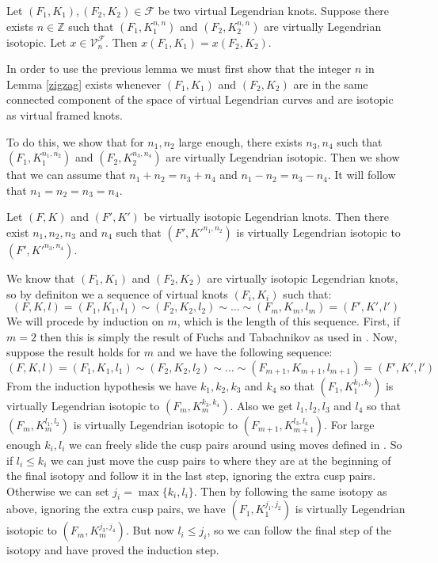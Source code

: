 \begin{lem}\label{zigzag} Let $(F_1,K_1), (F_2, K_2) \in \mathcal{F}$ be two virtual Legendrian knots. Suppose there exists $n\in \mathbb{Z}$ such that $(F_1,K_1^{n,n})$ and $(F_2,K_2^{n,n})$ are virtually Legendrian isotopic.  Let $x\in\mathcal{V}^\mathcal{F}_n$.  Then $x(F_1,K_1)=x(F_2,K_2)$.
\end{lem}

In order to use the previous lemma we must first show that the integer $n$ in Lemma \ref{zigzag} exists whenever $(F_1,K_1)$ and $(F_2,K_2)$ are in the same connected component of the space of virtual Legendrian curves and are isotopic as virtual framed knots.

To do this, we show that for $n_1,n_2$ large enough, there exists $n_3,n_4$ such that $(F_1,K_1^{n_1,n_2})$ and $(F_2,K_2^{n_3,n_4})$ are virtually Legendrian isotopic.  Then we show that we can assume that $n_1+n_2=n_3+n_4$ and $n_1-n_2=n_3-n_4$.  It will follow that $n_1=n_2=n_3=n_4$.


\begin{prop}\label{fuchstab}
Let $(F, K)$ and $(F', K')$ be virtually isotopic Legendrian knots.  Then there exist $n_1, n_2, n_3$ and $n_4$ such that $(F',K'^{n_1,n_2})$ is virtually Legendrian isotopic to $(F', K'^{n_3, n_4})$.
\end{prop}
\pp
We know that $(F_1, K_1)$ and $(F_2, K_2)$ are virtually isotopic Legendrian knots, so by definiton we a sequence of virtual knots $(F_i, K_i)$ such that: 
$$(F,K,l)=(F_1,K_1,l_1)\sim (F_2,K_2,l_2) \sim \dots \sim (F_m,K_m,l_m)=(F',K',l')$$
We will procede by induction on $m$, which is the length of this sequence.  First, if $m=2$ then this is simply the result of Fuchs and Tabachnikov as used in \cite{Chernov}.  Now, suppose the result holds for $m$ and we have the following sequence: 
$$(F,K,l)=(F_1,K_1,l_1)\sim (F_2,K_2,l_2) \sim \dots \sim (F_{m+1},K_{m+1},l_{m+1})=(F',K',l')$$
From the induction hypothesis we have $k_1,k_2, k_3$ and $k_4$ so that $(F_1,K_1^{k_1,k_2})$ is virtually Legendrian isotopic to $(F_m, K_m^{k_3, k_4})$.  Also we get $l_1, l_2, l_3$ and $l_4$ so that $(F_m,K_m^{l_1,l_2})$ is virtually Legendrian isotopic to $(F_{m+1}, K_{m+1}^{l_3, l_4})$.  For large enough $k_i, l_i$ we can freely slide the cusp pairs around using moves defined in \cite{f&t}.  So if $l_i \leq k_i$  we can just move the cusp pairs to where they are at the beginning of the final isotopy and follow it in the last step, ignoring the extra cusp pairs.  Otherwise we can set $j_i = \max\{k_i, l_i\}$.  Then by following the same isotopy as above, ignoring the extra cusp pairs, we have $(F_1,K_1^{j_1,j_2})$ is virtually Legendrian isotopic to $(F_m, K_m^{j_3, j_4})$.  But now $l_i \leq j_i$, so we can follow the final step of the isotopy and have proved the induction step.


